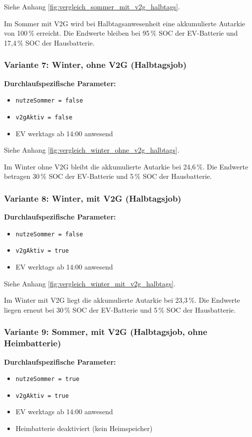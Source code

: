 \documentclass[conference]{IEEEtran}
\begin{document}
Siehe Anhang \ref{fig:vergleich_sommer_mit_v2g_halbtags}.

Im Sommer mit V2G wird bei Halbtagsanwesenheit eine akkumulierte Autarkie von 100\,\% erreicht. Die Endwerte bleiben bei 95\,\% SOC der EV-Batterie und 17,4\,\% SOC der Hausbatterie.

\subsubsection{Variante 7: Winter, ohne V2G (Halbtagsjob)}
\textbf{Durchlaufspezifische Parameter:}
\begin{itemize}
\item \texttt{nutzeSommer = false}
\item \texttt{v2gAktiv = false}
\item EV werktags ab 14:00 anwesend
\end{itemize}

Siehe Anhang \ref{fig:vergleich_winter_ohne_v2g_halbtags}.

Im Winter ohne V2G bleibt die akkumulierte Autarkie bei 24,6\,\%. Die Endwerte betragen 30\,\% SOC der EV-Batterie und 5\,\% SOC der Hausbatterie.

\subsubsection{Variante 8: Winter, mit V2G (Halbtagsjob)}
\textbf{Durchlaufspezifische Parameter:}
\begin{itemize}
\item \texttt{nutzeSommer = false}
\item \texttt{v2gAktiv = true}
\item EV werktags ab 14:00 anwesend
\end{itemize}

Siehe Anhang \ref{fig:vergleich_winter_mit_v2g_halbtags}.

Im Winter mit V2G liegt die akkumulierte Autarkie bei 23,3\,\%. Die Endwerte liegen erneut bei 30\,\% SOC der EV-Batterie und 5\,\% SOC der Hausbatterie.

\subsubsection{Variante 9: Sommer, mit V2G (Halbtagsjob, ohne Heimbatterie)}
\textbf{Durchlaufspezifische Parameter:}
\begin{itemize}
\item \texttt{nutzeSommer = true}
\item \texttt{v2gAktiv = true}
\item EV werktags ab 14:00 anwesend
\item Heimbatterie deaktiviert (kein Heimspeicher)
\end{itemize}
\end{document}

